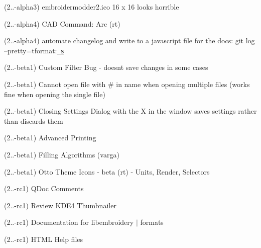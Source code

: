 \begin{DoxyRefList}
\label{todo__todo000033}%
%
(2..-\/alpha3) embroidermodder2.\+ico 16 x 16 looks horrible

\label{todo__todo000034}%
%
(2..-\/alpha4) CAD Command\+: Arc (rt)

\label{todo__todo000035}%
%
(2..-\/alpha4) automate changelog and write to a javascript file for the docs\+: git log --pretty=tformat\+:\textquotesingle{}\href{\\url{https://github.com/Embroidermodder/Embroidermodder/commit/\%H}}{\texttt{ s}}\textquotesingle{}

\label{todo__todo000036}%
%
(2..-\/beta1) Custom Filter Bug -\/ doesn\textquotesingle{}t save changes in some cases

\label{todo__todo000037}%
%
(2..-\/beta1) Cannot open file with {\ttfamily \#} in name when opening multiple files (works fine when opening the single file)

\label{todo__todo000038}%
%
(2..-\/beta1) Closing Settings Dialog with the X in the window saves settings rather than discards them

\label{todo__todo000039}%
%
(2..-\/beta1) Advanced Printing

\label{todo__todo000040}%
%
(2..-\/beta1) Filling Algorithms (varga)

\label{todo__todo000041}%
%
(2..-\/beta1) Otto Theme Icons -\/ beta (rt) -\/ Units, Render, Selectors

\label{todo__todo000042}%
%
(2..-\/rc1) QDoc Comments

\label{todo__todo000043}%
%
(2..-\/rc1) Review KDE4 Thumbnailer

\label{todo__todo000044}%
%
(2..-\/rc1) Documentation for libembroidery $|$ formats

\label{todo__todo000045}%
%
(2..-\/rc1) HTML Help files


\end{DoxyRefList}
